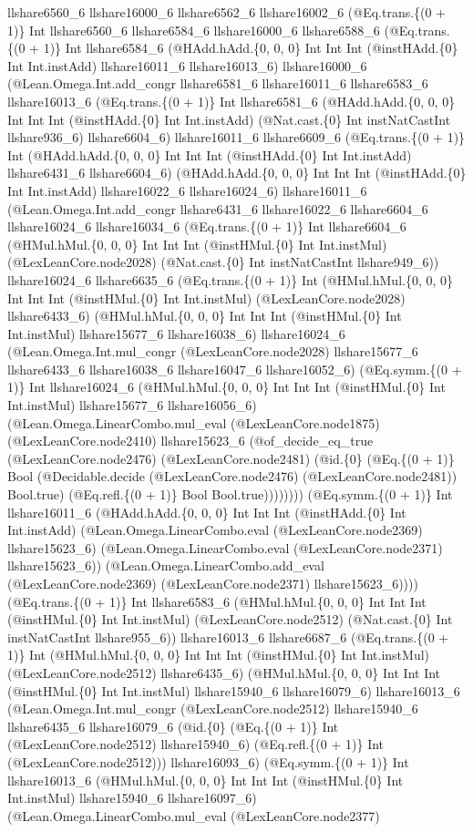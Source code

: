 \documentclass[11pt]{article}
\begin{document}
llshare6560\_6 llshare16000\_6 llshare6562\_6 llshare16002\_6 (@Eq.trans.\{(0 + 1)\} Int llshare6560\_6 llshare6584\_6 llshare16000\_6 llshare6588\_6 (@Eq.trans.\{(0 + 1)\} Int llshare6584\_6 (@HAdd.hAdd.\{0, 0, 0\} Int Int Int (@instHAdd.\{0\} Int Int.instAdd) llshare16011\_6 llshare16013\_6) llshare16000\_6 (@Lean.Omega.Int.add\_congr llshare6581\_6 llshare16011\_6 llshare6583\_6 llshare16013\_6 (@Eq.trans.\{(0 + 1)\} Int llshare6581\_6 (@HAdd.hAdd.\{0, 0, 0\} Int Int Int (@instHAdd.\{0\} Int Int.instAdd) (@Nat.cast.\{0\} Int instNatCastInt llshare936\_6) llshare6604\_6) llshare16011\_6 llshare6609\_6 (@Eq.trans.\{(0 + 1)\} Int (@HAdd.hAdd.\{0, 0, 0\} Int Int Int (@instHAdd.\{0\} Int Int.instAdd) llshare6431\_6 llshare6604\_6) (@HAdd.hAdd.\{0, 0, 0\} Int Int Int (@instHAdd.\{0\} Int Int.instAdd) llshare16022\_6 llshare16024\_6) llshare16011\_6 (@Lean.Omega.Int.add\_congr llshare6431\_6 llshare16022\_6 llshare6604\_6 llshare16024\_6 llshare16034\_6 (@Eq.trans.\{(0 + 1)\} Int llshare6604\_6 (@HMul.hMul.\{0, 0, 0\} Int Int Int (@instHMul.\{0\} Int Int.instMul) (@LexLeanCore.node2028) (@Nat.cast.\{0\} Int instNatCastInt llshare949\_6)) llshare16024\_6 llshare6635\_6 (@Eq.trans.\{(0 + 1)\} Int (@HMul.hMul.\{0, 0, 0\} Int Int Int (@instHMul.\{0\} Int Int.instMul) (@LexLeanCore.node2028) llshare6433\_6) (@HMul.hMul.\{0, 0, 0\} Int Int Int (@instHMul.\{0\} Int Int.instMul) llshare15677\_6 llshare16038\_6) llshare16024\_6 (@Lean.Omega.Int.mul\_congr (@LexLeanCore.node2028) llshare15677\_6 llshare6433\_6 llshare16038\_6 llshare16047\_6 llshare16052\_6) (@Eq.symm.\{(0 + 1)\} Int llshare16024\_6 (@HMul.hMul.\{0, 0, 0\} Int Int Int (@instHMul.\{0\} Int Int.instMul) llshare15677\_6 llshare16056\_6) (@Lean.Omega.LinearCombo.mul\_eval (@LexLeanCore.node1875) (@LexLeanCore.node2410) llshare15623\_6 (@of\_decide\_eq\_true (@LexLeanCore.node2476) (@LexLeanCore.node2481) (@id.\{0\} (@Eq.\{(0 + 1)\} Bool (@Decidable.decide (@LexLeanCore.node2476) (@LexLeanCore.node2481)) Bool.true) (@Eq.refl.\{(0 + 1)\} Bool Bool.true)))))))) (@Eq.symm.\{(0 + 1)\} Int llshare16011\_6 (@HAdd.hAdd.\{0, 0, 0\} Int Int Int (@instHAdd.\{0\} Int Int.instAdd) (@Lean.Omega.LinearCombo.eval (@LexLeanCore.node2369) llshare15623\_6) (@Lean.Omega.LinearCombo.eval (@LexLeanCore.node2371) llshare15623\_6)) (@Lean.Omega.LinearCombo.add\_eval (@LexLeanCore.node2369) (@LexLeanCore.node2371) llshare15623\_6)))) (@Eq.trans.\{(0 + 1)\} Int llshare6583\_6 (@HMul.hMul.\{0, 0, 0\} Int Int Int (@instHMul.\{0\} Int Int.instMul) (@LexLeanCore.node2512) (@Nat.cast.\{0\} Int instNatCastInt llshare955\_6)) llshare16013\_6 llshare6687\_6 (@Eq.trans.\{(0 + 1)\} Int (@HMul.hMul.\{0, 0, 0\} Int Int Int (@instHMul.\{0\} Int Int.instMul) (@LexLeanCore.node2512) llshare6435\_6) (@HMul.hMul.\{0, 0, 0\} Int Int Int (@instHMul.\{0\} Int Int.instMul) llshare15940\_6 llshare16079\_6) llshare16013\_6 (@Lean.Omega.Int.mul\_congr (@LexLeanCore.node2512) llshare15940\_6 llshare6435\_6 llshare16079\_6 (@id.\{0\} (@Eq.\{(0 + 1)\} Int (@LexLeanCore.node2512) llshare15940\_6) (@Eq.refl.\{(0 + 1)\} Int (@LexLeanCore.node2512))) llshare16093\_6) (@Eq.symm.\{(0 + 1)\} Int llshare16013\_6 (@HMul.hMul.\{0, 0, 0\} Int Int Int (@instHMul.\{0\} Int Int.instMul) llshare15940\_6 llshare16097\_6) (@Lean.Omega.LinearCombo.mul\_eval (@LexLeanCore.node2377) 
\end{document}
